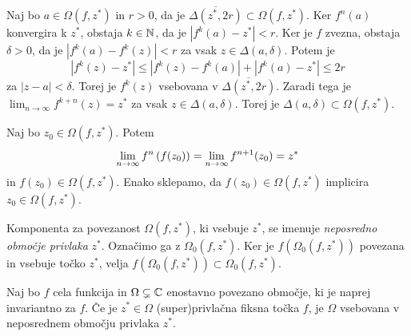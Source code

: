 \begin{dokaz}
    Naj bo \(a \in \Omega (f, z^*)\) in \(r > 0\), da je \(\overline{\Delta (z^*, 2r)} \subset \Omega (f, z^*)\). Ker \(f^n (a)\) konvergira k \(z^*\), obstaja \(k \in \mathbb N\), da je \(|f^k (a) - z^*| < r\). Ker je \(f\) zvezna, obstaja \(\delta > 0\), da je \(|f^k (a) - f^k (z)| < r\) za vsak \(z \in \Delta (a, \delta)\). Potem je
    \[|f^k (z) - z^*| \leq |f^k (z) - f^k (a)| + |f^k (a) - z^*| \leq 2r\]
    za \(|z - a| < \delta\). Torej je \(f^k (z)\) vsebovana v \(\overline{\Delta (z^*, 2r)}\). Zaradi tega je \(\lim_{n \to \infty} f^{k + n} (z) = z^*\) za vsak \(z \in \Delta (a, \delta)\). Torej je \(\Delta (a, \delta) \subset \Omega (f, z^*)\).

    Naj bo \(z_0 \in \Omega (f, z^*)\). Potem
    \[\lim_{n \to \infty} f^n \left( f (z_0) \right) = \lim_{n \to \infty} f^{n + 1} (z_0) = z^*\]
    in \(f (z_0) \in \Omega(f, z^*)\). Enako sklepamo, da \(f (z_0) \in \Omega (f, z^*)\) implicira \(z_0 \in \Omega (f, z^*)\).
\end{dokaz}

\noindent Komponenta za povezanost \(\Omega (f, z^*)\), ki vsebuje \(z^*\), se imenuje \emph{neposredno območje privlaka} \(z^*\). Označimo ga z \(\Omega_0 (f, z^*)\). Ker je \(f (\Omega_0 (f, z^*))\) povezana in vsebuje točko \(z^*\), velja \(f (\Omega_0 (f, z^*)) \subset \Omega_0 (f, z^*)\).

\begin{trditev} \label{prop:privlak}
    Naj bo \(f\) cela funkcija in \(\Omega \subsetneq \mathbb C\) enostavno povezano območje, ki je naprej invariantno za \(f\). Če je \(z^{*} \in \Omega\) (super)privlačna fiksna točka \(f\), je \(\Omega\) vsebovana v neposrednem območju privlaka \(z^*\).
\end{trditev}

